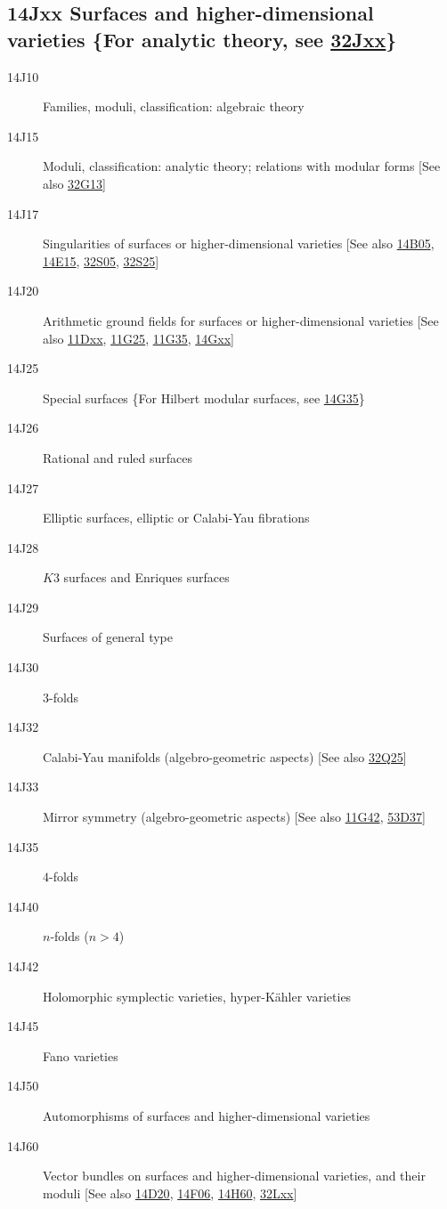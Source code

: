 \documentclass[letterpaper]{article}
\begin{document}
\subsection*{14Jxx Surfaces and higher-dimensional varieties \{For analytic theory, see \hyperref[32Jxx]{32Jxx}\} }\label{14Jxx}
\begin{description}               
\item [14J10]\label{14J10} Families, moduli, classification: algebraic theory
\item [14J15]\label{14J15} Moduli, classification: analytic theory; relations with modular forms [See also \hyperref[32G13]{32G13}]
\item [14J17]\label{14J17} Singularities of surfaces or higher-dimensional varieties [See also \hyperref[14B05]{14B05}, \hyperref[14E15]{14E15}, \hyperref[32S05]{32S05}, \hyperref[32S25]{32S25}]
\item [14J20]\label{14J20} Arithmetic ground fields for surfaces or higher-dimensional varieties [See also \hyperref[11Dxx]{11Dxx}, \hyperref[11G25]{11G25}, \hyperref[11G35]{11G35}, \hyperref[14Gxx]{14Gxx}]
\item [14J25]\label{14J25} Special surfaces \{For Hilbert modular surfaces, see \hyperref[14G35]{14G35}\}
\item [14J26]\label{14J26} Rational and ruled surfaces
\item [14J27]\label{14J27} Elliptic surfaces, elliptic or Calabi-Yau fibrations
\item [14J28]\label{14J28} $K3$ surfaces and Enriques surfaces
\item [14J29]\label{14J29} Surfaces of general type
\item [14J30]\label{14J30} $3$-folds
\item [14J32]\label{14J32} Calabi-Yau manifolds (algebro-geometric aspects) [See also \hyperref[32Q25]{32Q25}]
\item [14J33]\label{14J33} Mirror symmetry (algebro-geometric aspects) [See also \hyperref[11G42]{11G42}, \hyperref[53D37]{53D37}]
\item [14J35]\label{14J35} $4$-folds
\item [14J40]\label{14J40} $n$-folds ($n>4$)
\item [14J42]\label{14J42} Holomorphic symplectic varieties, hyper-K\"{a}hler varieties
\item [14J45]\label{14J45} Fano varieties
\item [14J50]\label{14J50} Automorphisms of surfaces and higher-dimensional varieties
\item [14J60]\label{14J60} Vector bundles on surfaces and higher-dimensional varieties, and their moduli [See also \hyperref[14D20]{14D20}, \hyperref[14F06]{14F06}, \hyperref[14H60]{14H60}, \hyperref[32Lxx]{32Lxx}]

\end{description}
\end{document}
